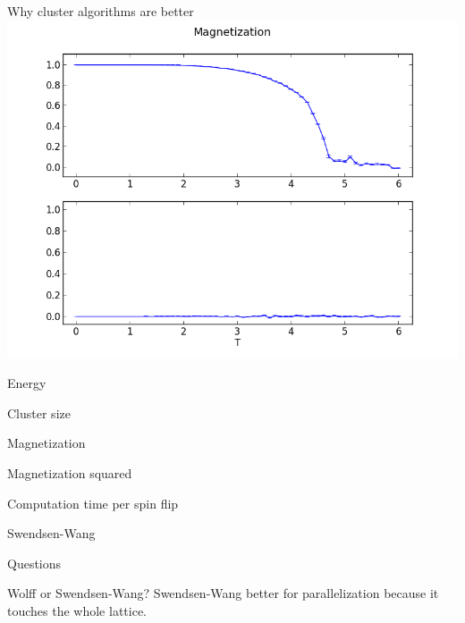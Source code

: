 \documentclass[]{beamer}
\begin{document}
\begin{frame}{Why cluster algorithms are better}
\includegraphics[width=\textwidth]{img/comp_magnetization.png}
\end{frame}

\begin{frame}{Energy}
\end{frame}

\begin{frame}{Cluster size}
\end{frame}

\begin{frame}{Magnetization}
\end{frame}

\begin{frame}{Magnetization squared}
\end{frame}

\begin{frame}{Computation time per spin flip}
\end{frame}

\begin{frame}{Swendsen-Wang}
\end{frame}


\begin{frame}
\centerline{\huge{Questions}}
\end{frame}

\begin{frame}{Wolff or Swendsen-Wang?}
Swendsen-Wang better for parallelization because it touches the whole lattice.
\end{frame}
\end{document}
